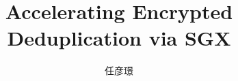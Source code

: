 \documentclass[bachelor]{thesis-uestc}
\title{Accelerating Encrypted Deduplication via SGX}
\author{任彦璟}
\begin{document}
\thesischapterexordium



\nocite{*}


\end{document}
